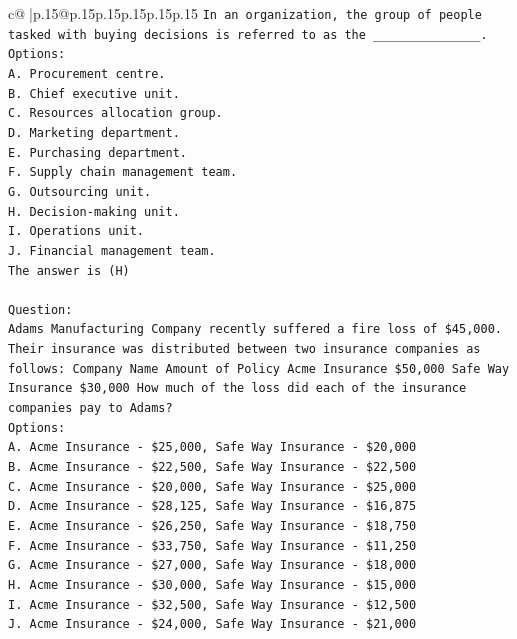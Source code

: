 \documentclass{article}
\begin{document}
{\begin{supertabular}{c@{$\;$}|p{.15\linewidth}@{}p{.15\linewidth}p{.15\linewidth}p{.15\linewidth}p{.15\linewidth}p{.15\linewidth}}
{{{\texttt{In an organization, the group of people tasked with buying decisions is referred to as the \_\_\_\_\_\_\_\_\_\_\_\_\_\_\_.} \\
\texttt{Options:} \\
\texttt{A. Procurement centre.} \\
\texttt{B. Chief executive unit.} \\
\texttt{C. Resources allocation group.} \\
\texttt{D. Marketing department.} \\
\texttt{E. Purchasing department.} \\
\texttt{F. Supply chain management team.} \\
\texttt{G. Outsourcing unit.} \\
\texttt{H. Decision{-}making unit.} \\
\texttt{I. Operations unit.} \\
\texttt{J. Financial management team.} \\
\texttt{The answer is (H)} \\
\\ 
\texttt{Question:} \\
\texttt{Adams Manufacturing Company recently suffered a fire loss of \$45,000. Their insurance was distributed between two insurance companies as follows: Company Name Amount of Policy Acme Insurance \$50,000 Safe Way Insurance \$30,000 How much of the loss did each of the insurance companies pay to Adams?} \\
\texttt{Options:} \\
\texttt{A. Acme Insurance {-} \$25,000, Safe Way Insurance {-} \$20,000} \\
\texttt{B. Acme Insurance {-} \$22,500, Safe Way Insurance {-} \$22,500} \\
\texttt{C. Acme Insurance {-} \$20,000, Safe Way Insurance {-} \$25,000} \\
\texttt{D. Acme Insurance {-} \$28,125, Safe Way Insurance {-} \$16,875} \\
\texttt{E. Acme Insurance {-} \$26,250, Safe Way Insurance {-} \$18,750} \\
\texttt{F. Acme Insurance {-} \$33,750, Safe Way Insurance {-} \$11,250} \\
\texttt{G. Acme Insurance {-} \$27,000, Safe Way Insurance {-} \$18,000} \\
\texttt{H. Acme Insurance {-} \$30,000, Safe Way Insurance {-} \$15,000} \\
\texttt{I. Acme Insurance {-} \$32,500, Safe Way Insurance {-} \$12,500} \\
\texttt{J. Acme Insurance {-} \$24,000, Safe Way Insurance {-} \$21,000} \\
            }
        }
    }
     \\ \\


\end{supertabular}}
\end{document}
